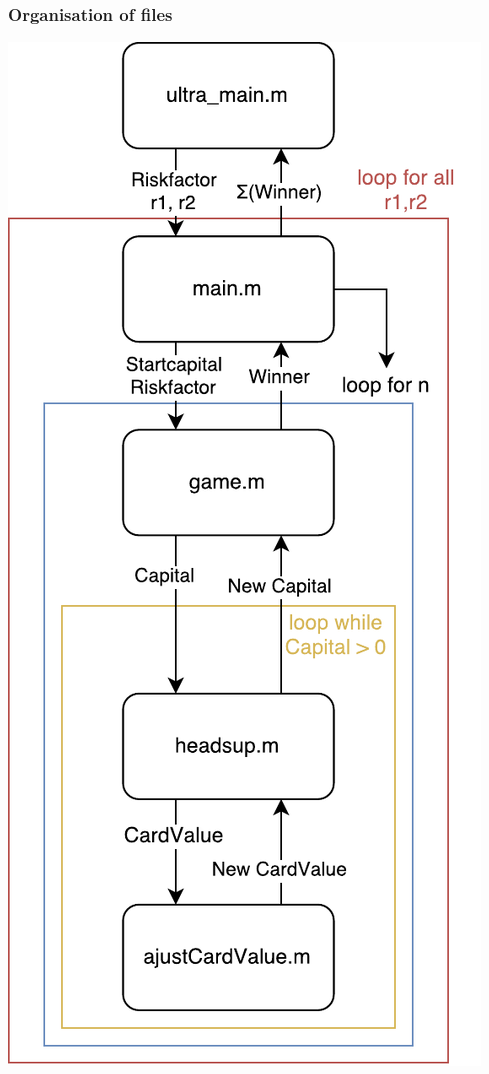 \documentclass[11pt]{article}
\begin{document}
\subsubsection{Organisation of files}
\begin{minipage}{0.48\textwidth}
\includegraphics[width=\textwidth]{Graphics/diagram_senkrecht.pdf}
\end{minipage}
\end{document}
